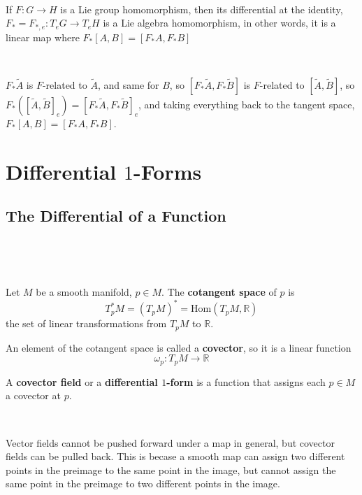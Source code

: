 \documentclass{article}
\begin{document}
\begin{proposition}
  \

  If $F: G \to H$ is a Lie group homomorphism, then its differential at the identity, $F_* = F_{*,e}: T_eG \to T_eH$ is a Lie algebra homomorphism, in other words, it is a linear map where $F_*[A,B] = [F_*A, F_*B]$
\end{proposition}

\begin{customproof}
  \

  $F_*\tilde{A}$ is $F$-related to $\tilde{A}$, and same for $B$, so $[F_*\tilde{A}, F_*\tilde{B}]$ is $F$-related to $[\tilde{A}, \tilde{B}]$, so $F_*([\tilde{A},\tilde{B}]_e) = [F_*\tilde{A}, F_*\tilde{B}]_e$, and taking everything back to the tangent space, $F_*[A,B] = [F_*A, F_*B]$.
\end{customproof}


\section{Differential $1$-Forms}

\subsection{The Differential of a Function}
\

\begin{definition}
  \

  Let $M$ be a smooth manifold, $p \in M$. The \textbf{cotangent space} of $p$ is $$T_p^*M = (T_pM)^* = \text{Hom}(T_pM, \mathbb{R})$$the set of linear transformations from $T_pM$ to $\mathbb{R}$.

  An element of the cotangent space is called a \textbf{covector}, so it is a linear function $$\omega_p: T_pM \to \mathbb{R}$$

  A \textbf{covector field} or a \textbf{differential $1$-form} is a function that assigns each $p \in M$ a covector at $p$.
\end{definition}

\begin{remark}
  \

  Vector fields cannot be pushed forward under a map in general, but covector fields can be pulled back. This is becase a smooth map can assign two different points in the preimage to the same point in the image, but cannot assign the same point in the preimage to two different points in the image.
\end{remark}
\end{document}
